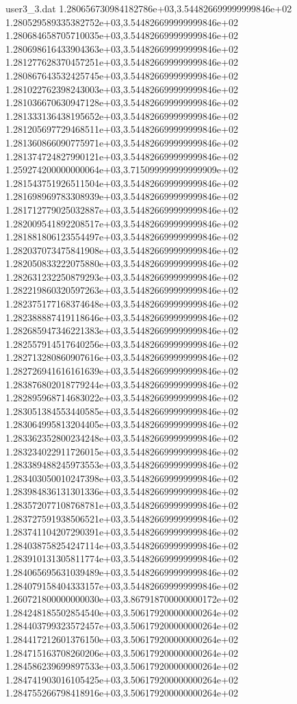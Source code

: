 \begin{filecontents}{user3_3.dat}
1.280656730984182786e+03,3.544826699999999846e+02
1.280529589335382752e+03,3.544826699999999846e+02
1.280684658705710035e+03,3.544826699999999846e+02
1.280698616433904363e+03,3.544826699999999846e+02
1.281277628370457251e+03,3.544826699999999846e+02
1.280867643532425745e+03,3.544826699999999846e+02
1.281022762398243003e+03,3.544826699999999846e+02
1.281036670630947128e+03,3.544826699999999846e+02
1.281333136438195652e+03,3.544826699999999846e+02
1.281205697729468511e+03,3.544826699999999846e+02
1.281360866090775971e+03,3.544826699999999846e+02
1.281374724827990121e+03,3.544826699999999846e+02
1.259274200000000064e+03,3.715099999999999909e+02
1.281543751926511504e+03,3.544826699999999846e+02
1.281698969783308939e+03,3.544826699999999846e+02
1.281712779025032887e+03,3.544826699999999846e+02
1.282009541892208517e+03,3.544826699999999846e+02
1.281881806123554497e+03,3.544826699999999846e+02
1.282037073475841908e+03,3.544826699999999846e+02
1.282050833222075880e+03,3.544826699999999846e+02
1.282631232250879293e+03,3.544826699999999846e+02
1.282219860320597263e+03,3.544826699999999846e+02
1.282375177168374648e+03,3.544826699999999846e+02
1.282388887419118646e+03,3.544826699999999846e+02
1.282685947346221383e+03,3.544826699999999846e+02
1.282557914517640256e+03,3.544826699999999846e+02
1.282713280860907616e+03,3.544826699999999846e+02
1.282726941616161639e+03,3.544826699999999846e+02
1.283876802018779244e+03,3.544826699999999846e+02
1.282895968714683022e+03,3.544826699999999846e+02
1.283051384553440585e+03,3.544826699999999846e+02
1.283064995813204405e+03,3.544826699999999846e+02
1.283362352800234248e+03,3.544826699999999846e+02
1.283234022911726015e+03,3.544826699999999846e+02
1.283389488245973553e+03,3.544826699999999846e+02
1.283403050010247398e+03,3.544826699999999846e+02
1.283984836131301336e+03,3.544826699999999846e+02
1.283572077108768781e+03,3.544826699999999846e+02
1.283727591938506521e+03,3.544826699999999846e+02
1.283741104207290391e+03,3.544826699999999846e+02
1.284038758254247114e+03,3.544826699999999846e+02
1.283910131305811774e+03,3.544826699999999846e+02
1.284065695631039489e+03,3.544826699999999846e+02
1.284079158404333157e+03,3.544826699999999846e+02
1.260721800000000030e+03,3.867918700000000172e+02
1.284248185502854540e+03,3.506179200000000264e+02
1.284403799323572457e+03,3.506179200000000264e+02
1.284417212601376150e+03,3.506179200000000264e+02
1.284715163708260206e+03,3.506179200000000264e+02
1.284586239699897533e+03,3.506179200000000264e+02
1.284741903016105425e+03,3.506179200000000264e+02
1.284755266798418916e+03,3.506179200000000264e+02

\end{filecontents}
